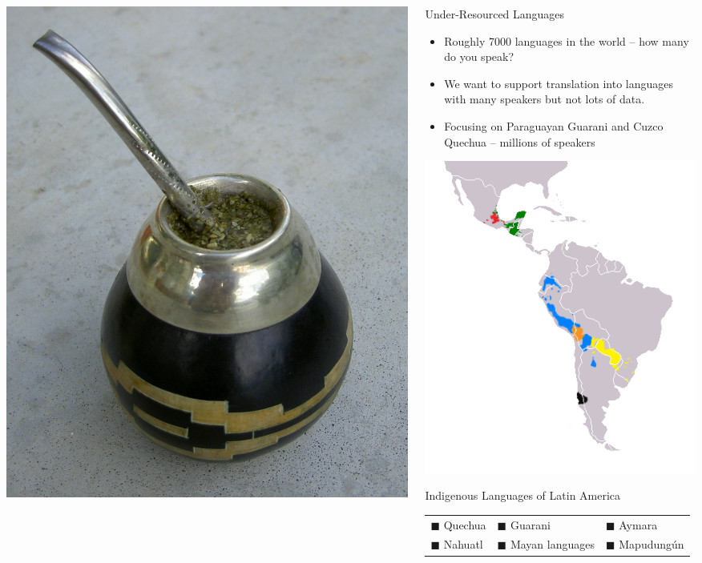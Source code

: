 \documentclass[final]{beamer}
\begin{document}
\begin{frame}{}
\begin{columns}[t]
\begin{column}{.32\linewidth}
  \centering
  \includegraphics[width=.3\linewidth]{guampa_mate.jpg}
  \end{column}

  \begin{column}{.32\linewidth}
  \vfill
  \begin{block}{\large Under-Resourced Languages}
    \begin{itemize}
    \item Roughly 7000 languages in the world -- how many do you speak?
    \item We want to support translation into languages with many speakers
    but not lots of data.
    \item Focusing on Paraguayan Guarani and Cuzco Quechua -- millions of
    speakers
    \end{itemize}
  \end{block}

  \centering
  \includegraphics[width=.40\linewidth]{Map-Most_Widely_Spoken_Native_Languages_in_Latin_America.png}
  \begin{block}{\large Indigenous Languages of Latin America}
    \begin{tabular}{lll}
      {\color{blue}        $\blacksquare$} Quechua &
      {\color{yellow}      $\blacksquare$} Guarani &
      {\color{orange}      $\blacksquare$} Aymara \\
      {\color{red}         $\blacksquare$} Nahuatl &
      {\color{htmlgreen}   $\blacksquare$} Mayan languages &
      {\color{black}       $\blacksquare$} Mapudungún
    \end{tabular}
  \end{block}


\end{column}
\end{columns}
\end{frame}
\end{document}
